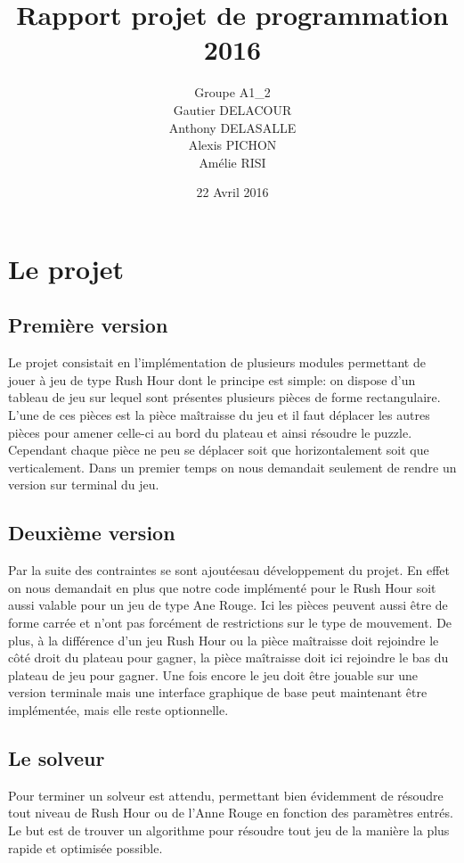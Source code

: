 \documentclass{report}
\title{Rapport projet de programmation 2016}
\author{Groupe A1\_2\\Gautier DELACOUR\\Anthony DELASALLE\\Alexis PICHON\\Amélie RISI}
\date{22 Avril 2016}
\begin{document}
\maketitle
\tableofcontents

\chapter{Le projet}
\section{Première version}
Le projet consistait en l'implémentation de plusieurs modules permettant de jouer à jeu de type Rush Hour dont le principe est simple: on dispose d'un tableau de jeu sur lequel sont présentes plusieurs pièces de forme rectangulaire. L'une de ces pièces est la pièce maîtraisse du jeu et il faut déplacer les autres pièces pour amener celle-ci au bord du plateau et ainsi résoudre le puzzle. Cependant chaque pièce ne peu se déplacer soit que horizontalement soit que verticalement.
Dans un premier temps on nous demandait seulement de rendre un version sur terminal du jeu.

\section{Deuxième version}
Par la suite des contraintes se sont ajoutéesau développement du projet. En effet on nous demandait en plus que notre code implémenté pour le Rush Hour soit aussi valable pour un jeu de type Ane Rouge. Ici les pièces peuvent aussi être de forme carrée et n'ont pas forcément de restrictions sur le type de mouvement. De plus, à la différence d'un jeu Rush Hour ou la pièce maîtraisse doit rejoindre le côté droit du plateau pour gagner, la pièce maîtraisse doit ici rejoindre le bas du plateau de jeu pour gagner.
Une fois encore le jeu doit être jouable sur une version terminale mais une interface graphique de base peut maintenant être implémentée, mais elle reste optionnelle.

\section{Le solveur}
Pour terminer un solveur est attendu, permettant bien évidemment de résoudre tout niveau de Rush Hour ou de l'Anne Rouge en fonction des paramètres entrés. Le but est de trouver un algorithme pour résoudre tout jeu de la manière la plus rapide et optimisée possible.
\end{document}
